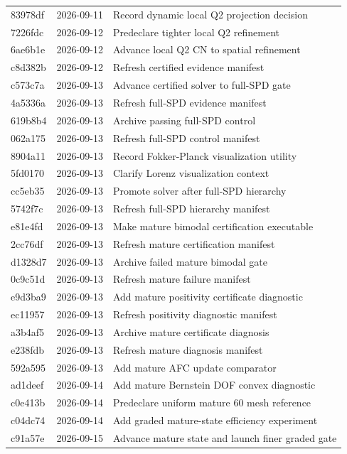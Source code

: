 \begin{longtable}{p{}p{}p{}}
83978df & 2026-09-11 & Record dynamic local Q2 projection decision\\
7226fdc & 2026-09-12 & Predeclare tighter local Q2 refinement\\
6ae6b1e & 2026-09-12 & Advance local Q2 CN to spatial refinement\\
c8d382b & 2026-09-12 & Refresh certified evidence manifest\\
c573c7a & 2026-09-13 & Advance certified solver to full-SPD gate\\
4a5336a & 2026-09-13 & Refresh full-SPD evidence manifest\\
619b8b4 & 2026-09-13 & Archive passing full-SPD control\\
062a175 & 2026-09-13 & Refresh full-SPD control manifest\\
8904a11 & 2026-09-13 & Record Fokker-Planck visualization utility\\
5fd0170 & 2026-09-13 & Clarify Lorenz visualization context\\
cc5eb35 & 2026-09-13 & Promote solver after full-SPD hierarchy\\
5742f7c & 2026-09-13 & Refresh full-SPD hierarchy manifest\\
e81e4fd & 2026-09-13 & Make mature bimodal certification executable\\
2cc76df & 2026-09-13 & Refresh mature certification manifest\\
d1328d7 & 2026-09-13 & Archive failed mature bimodal gate\\
0c9c51d & 2026-09-13 & Refresh mature failure manifest\\
e9d3ba9 & 2026-09-13 & Add mature positivity certificate diagnostic\\
ec11957 & 2026-09-13 & Refresh positivity diagnostic manifest\\
a3b4af5 & 2026-09-13 & Archive mature certificate diagnosis\\
e238fdb & 2026-09-13 & Refresh mature diagnosis manifest\\
592a595 & 2026-09-13 & Add mature AFC update comparator\\
ad1deef & 2026-09-14 & Add mature Bernstein DOF convex diagnostic\\
c0e413b & 2026-09-14 & Predeclare uniform mature 60 mesh reference\\
c04dc74 & 2026-09-14 & Add graded mature-state efficiency experiment\\
c91a57e & 2026-09-15 & Advance mature state and launch finer graded gate\\

\end{longtable}
